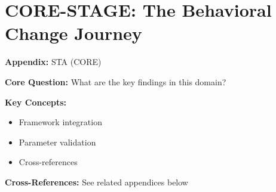 %
%

\chapter{CORE-STAGE: The Behavioral Change Journey}
\label{app:core-stage}

\begin{tcolorbox}[colback=blue!5!white, colframe=blue!75!black,
    title=Quick Reference: Appendix STA]

\textbf{Appendix:} STA (CORE)

\textbf{Core Question:} What are the key findings in this domain?

\textbf{Key Concepts:}
\begin{itemize}[nosep]
\item Framework integration
\item Parameter validation
\item Cross-references
\end{itemize}

\textbf{Cross-References:} See related appendices below
\end{tcolorbox}

